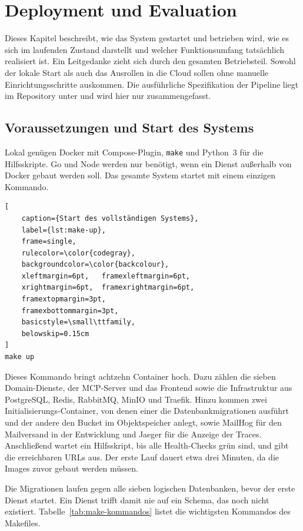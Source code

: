 \chapter{Deployment und Evaluation}
\label{chap:deployment}

Dieses Kapitel beschreibt, wie das System gestartet und betrieben wird, wie es sich im laufenden Zustand darstellt und welcher Funktionsumfang tatsächlich realisiert ist. Ein Leitgedanke zieht sich durch den gesamten Betriebsteil. Sowohl der lokale Start als auch das Ausrollen in die Cloud sollen ohne manuelle Einrichtungsschritte auskommen. Die ausführliche Spezifikation der Pipeline liegt im Repository unter  und wird hier nur zusammengefasst.

\section{Voraussetzungen und Start des Systems}
\label{sec:start}

Lokal genügen Docker mit Compose-Plugin, \texttt{make} und Python~3 für die Hilfsskripte. Go und Node werden nur benötigt, wenn ein Dienst außerhalb von Docker gebaut werden soll. Das gesamte System startet mit einem einzigen Kommando.

\begin{lstlisting}[
    caption={Start des vollständigen Systems},
    label={lst:make-up},
    frame=single,
    rulecolor=\color{codegray},
    backgroundcolor=\color{backcolour},
    xleftmargin=6pt,   framexleftmargin=6pt,
    xrightmargin=6pt,  framexrightmargin=6pt,
    framextopmargin=3pt,
    framexbottommargin=3pt,
    basicstyle=\small\ttfamily,
    belowskip=0.15cm
]
make up
\end{lstlisting}

Dieses Kommando bringt achtzehn Container hoch. Dazu zählen die sieben Domain-Dienste, der MCP-Server und das Frontend sowie die Infrastruktur aus PostgreSQL, Redis, RabbitMQ, MinIO und Traefik. Hinzu kommen zwei Initialisierungs-Container, von denen einer die Datenbankmigrationen ausführt und der andere den Bucket im Objektspeicher anlegt, sowie MailHog für den Mailversand in der Entwicklung und Jaeger für die Anzeige der Traces. Anschließend wartet ein Hilfsskript, bis alle Health-Checks grün sind, und gibt die erreichbaren URLs aus. Der erste Lauf dauert etwa drei Minuten, da die Images zuvor gebaut werden müssen.

Die Migrationen laufen gegen alle sieben logischen Datenbanken, bevor der erste Dienst startet. Ein Dienst trifft damit nie auf ein Schema, das noch nicht existiert. Tabelle~\vref{tab:make-kommandos} listet die wichtigsten Kommandos des Makefiles.

